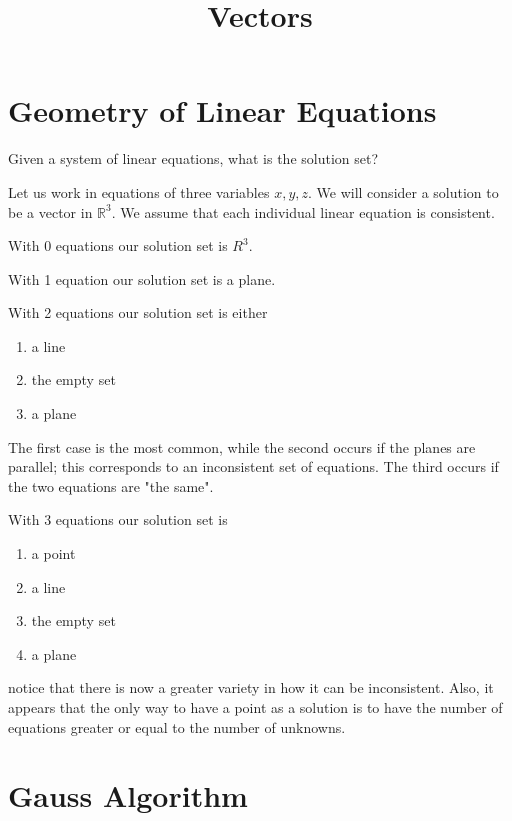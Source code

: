 \documentclass{article}
\title{Vectors}
\date{}
\begin{document}
\maketitle

\section{Geometry of Linear Equations}

Given a system of linear equations, what is the solution set?

Let us work in equations of three variables $x, y, z$. We will consider a solution to be a vector in $\mathbb{R}^3$. We assume that each individual linear equation is consistent.

With 0 equations our solution set is $R^3$.

With 1 equation our solution set is a plane.

With 2 equations our solution set is either

\begin{enumerate}\itemsep0pt
\item{a line}
\item{the empty set}
\item{a plane}
\end{enumerate}

The first case is the most common, while the second occurs if the planes are parallel; this corresponds to an inconsistent set of equations. The third occurs if the two equations are "the same".

With 3 equations our solution set is

\begin{enumerate}\itemsep0pt
\item{a point}
\item{a line}
\item{the empty set}
\item{a plane}
\end{enumerate}

notice that there is now a greater variety in how it can be inconsistent. Also, it appears that the only way to have a point as a solution is to have the number of equations greater or equal to the number of unknowns.

\section{Gauss Algorithm}

\theoremstyle{definition}
\end{document}
